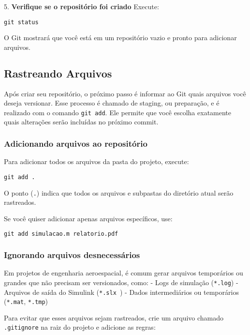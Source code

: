 5. \textbf{Verifique se o repositório foi criado}  
   Execute:
\begin{lstlisting}[style=shellstyle]
git status
\end{lstlisting}
O Git mostrará que você está em um repositório vazio e pronto para adicionar arquivos.


\subsection{Rastreando Arquivos}

Após criar seu repositório, o próximo passo é informar ao Git quais arquivos você deseja versionar. Esse processo é chamado de staging, ou preparação, e é realizado com o comando \texttt{git add}. Ele permite que você escolha exatamente quais alterações serão incluídas no próximo commit.

\subsubsection*{Adicionando arquivos ao repositório}

Para adicionar todos os arquivos da pasta do projeto, execute:

\begin{lstlisting}[style=shellstyle]
git add .
\end{lstlisting}

\noindent
O ponto (\texttt{.}) indica que todos os arquivos e subpastas do diretório atual serão rastreados.  

Se você quiser adicionar apenas arquivos específicos, use:

\begin{lstlisting}[style=shellstyle]
git add simulacao.m relatorio.pdf
\end{lstlisting}

\subsubsection*{Ignorando arquivos desnecessários}

Em projetos de engenharia aeroespacial, é comum gerar arquivos temporários ou grandes que não precisam ser versionados, como:  
- Logs de simulação (\texttt{*.log})  
- Arquivos de saída do Simulink (\texttt{*.slx~})  
- Dados intermediários ou temporários (\texttt{*.mat}, \texttt{*.tmp})

Para evitar que esses arquivos sejam rastreados, crie um arquivo chamado \texttt{.gitignore} na raiz do projeto e adicione as regras:

